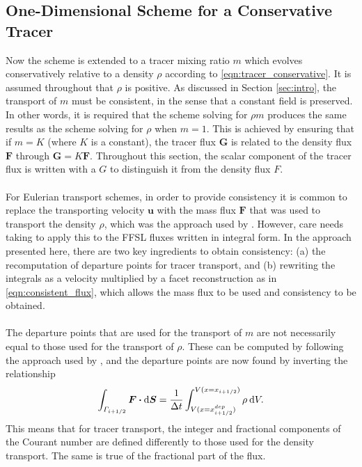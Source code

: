 \documentclass[11pt,a4paper]{article}
\newcommand{\dx}[1]{\hspace{0.75mm}\mathrm{d}{#1}}
\begin{document}
\subsection{One-Dimensional Scheme for a Conservative Tracer} \label{sec:1D_tracer}
Now the scheme is extended to a tracer mixing ratio $m$ which evolves conservatively relative to a density $\rho$ according to \eqref{eqn:tracer_conservative}.
It is assumed throughout that $\rho$ is positive.
As discussed in Section \ref{sec:intro}, the transport of $m$ must be consistent, in the sense that a constant field is preserved.
In other words, it is required that the scheme solving for $\rho m$ produces the same results as the scheme solving for $\rho$ when $m=1$.
This is achieved by ensuring that if $m=K$ (where $K$ is a constant), the tracer flux $\bm{G}$ is related to the density flux $\bm{F}$ through $\bm{G}=K\bm{F}$.
Throughout this section, the scalar component of the tracer flux is written with a $G$ to distinguish it from the density flux $F$.
\\
\\
For Eulerian transport schemes, in order to provide consistency it is common to replace the transporting velocity $\bm{u}$ with the mass flux $\bm{F}$ that was used to transport the density $\rho$, which was the approach used by \citet{bendall2023solution}.
However, care needs taking to apply this to the FFSL fluxes written in integral form.
In the approach presented here, there are two key ingredients to obtain consistency:
(a) the recomputation of departure points for tracer transport, and (b) rewriting the integrals as a velocity multiplied by a facet reconstruction as in \eqref{eqn:consistent_flux}, which allows the mass flux to be used and consistency to be obtained. \\
\\
The departure points that are used for the transport of $m$ are not necessarily equal to those used for the transport of $\rho$.
These can be computed by following the approach used by \cite{skamarock2006limiters}, and the departure points are now found by inverting the relationship
\begin{equation}
\int_{\varGamma_{i+1/2}} \bm{F} \bm{\cdot} \mathrm{d}\bm{S} = \frac{1}{\Delta t} \int_{V(x=x^{dep}_{i+1/2})}^{V(x=x_{i+1/2})} \rho \dx{V}.
\end{equation}
This means that for tracer transport, the integer and fractional components of the Courant number are defined differently to those used for the density transport.
The same is true of the fractional part of the flux.
\end{document}
